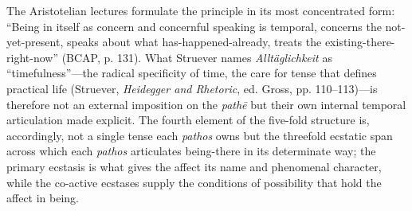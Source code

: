 The Aristotelian lectures formulate the principle in its most concentrated form: ``Being in itself as concern and concernful speaking is temporal, concerns the not-yet-present, speaks about what has-happened-already, treats the existing-there-right-now'' (BCAP, p. 131). What Struever names \textit{Alltäglichkeit} as ``timefulness''---the radical specificity of time, the care for tense that defines practical life (Struever, \textit{Heidegger and Rhetoric}, ed. Gross, pp. 110--113)---is therefore not an external imposition on the \textit{pathē} but their own internal temporal articulation made explicit. The fourth element of the five-fold structure is, accordingly, not a single tense each \textit{pathos} owns but the threefold ecstatic span across which each \textit{pathos} articulates being-there in its determinate way; the primary ecstasis is what gives the affect its name and phenomenal character, while the co-active ecstases supply the conditions of possibility that hold the affect in being.

